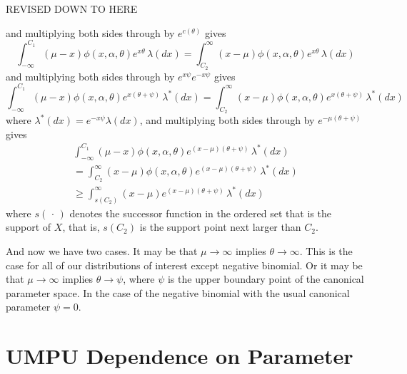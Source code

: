 \documentclass[11pt]{article}
\newcommand{\fatdot}{\,\cdot\,}
\begin{document}
\begin{center} \LARGE REVISED DOWN TO HERE \end{center}

and multiplying both sides through by $e^{c(\theta)}$ gives
$$
   \int_{- \infty}^{C_1} (\mu - x) \phi(x, \alpha, \theta)
   e^{x \theta} \, \lambda(d x)
   =
   \int_{C_2}^\infty (x - \mu) \phi(x, \alpha, \theta)
   e^{x \theta} \, \lambda(d x)
$$
and multiplying both sides through by $e^{x \psi} e^{- x \psi}$ gives
$$
   \int_{- \infty}^{C_1} (\mu - x) \phi(x, \alpha, \theta)
   e^{x (\theta + \psi)} \, \lambda^*(d x)
   =
   \int_{C_2}^\infty (x - \mu) \phi(x, \alpha, \theta)
   e^{x (\theta + \psi)} \, \lambda^*(d x)
$$
where $\lambda^*(d x) = e^{- x \psi} \lambda(d x)$,
and multiplying both sides through by $e^{- \mu (\theta + \psi)}$ gives
\begin{multline*}
   \int_{- \infty}^{C_1} (\mu - x) \phi(x, \alpha, \theta)
   e^{(x - \mu) (\theta + \psi)} \, \lambda^*(d x)
   \\
   =
   \int_{C_2}^\infty (x - \mu) \phi(x, \alpha, \theta)
   e^{(x - \mu) (\theta + \psi)} \, \lambda^*(d x)
   \\
   \ge
   \int_{s(C_2)}^\infty (x - \mu)
   e^{(x - \mu) (\theta + \psi)} \, \lambda^*(d x)
\end{multline*}
where $s(\fatdot)$ denotes the successor function in the ordered set
that is the support of $X$, that is, $s(C_2)$ is the support point next
larger than $C_2$.

And now we have two cases.
It may be that $\mu \to \infty$ implies
$\theta \to \infty$.  This is the case for all of our distributions of
interest except negative binomial.
Or it may be that $\mu \to \infty$ implies $\theta \to \psi$, where $\psi$
is the upper boundary point of the canonical parameter space.  In the case
of the negative binomial with the usual canonical parameter $\psi = 0$.

\section{UMPU Dependence on Parameter}
\end{document}

